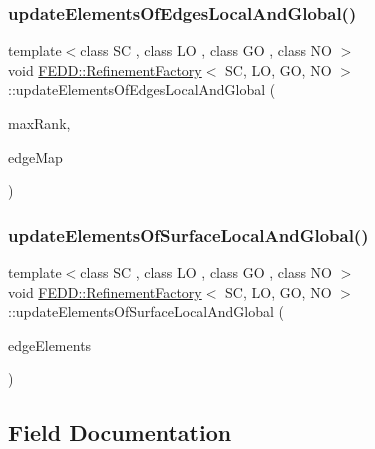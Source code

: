 \subsubsection{\texorpdfstring{update\+Elements\+Of\+Edges\+Local\+And\+Global()}{updateElementsOfEdgesLocalAndGlobal()}}
{\footnotesize\ttfamily template$<$class SC , class LO , class GO , class NO $>$ \\
void \hyperlink{classFEDD_1_1RefinementFactory}{F\+E\+D\+D\+::\+Refinement\+Factory}$<$ SC, LO, GO, NO $>$\+::update\+Elements\+Of\+Edges\+Local\+And\+Global (\begin{DoxyParamCaption}\item[{int}]{max\+Rank,  }\item[{\hyperlink{classFEDD_1_1RefinementFactory_a8256ccdf1b2a5c977ddc011f4e8eb8d3}{Map\+Const\+Ptr\+\_\+\+Type}}]{edge\+Map }\end{DoxyParamCaption})}

\mbox{\label{classFEDD_1_1RefinementFactory_a8f295b405de2c056298b695bea51887b}} 
\subsubsection{\texorpdfstring{update\+Elements\+Of\+Surface\+Local\+And\+Global()}{updateElementsOfSurfaceLocalAndGlobal()}}
{\footnotesize\ttfamily template$<$class SC , class LO , class GO , class NO $>$ \\
void \hyperlink{classFEDD_1_1RefinementFactory}{F\+E\+D\+D\+::\+Refinement\+Factory}$<$ SC, LO, GO, NO $>$\+::update\+Elements\+Of\+Surface\+Local\+And\+Global (\begin{DoxyParamCaption}\item[{\hyperlink{classFEDD_1_1RefinementFactory_ae5285e990ec4632d6188a1280627ad13}{Edge\+Elements\+Ptr\+\_\+\+Type}}]{edge\+Elements }\end{DoxyParamCaption})}



\subsection{Field Documentation}
\mbox{\label{classFEDD_1_1RefinementFactory_ac8f78b4bd97729d0ca0a3a36097da107}} 
